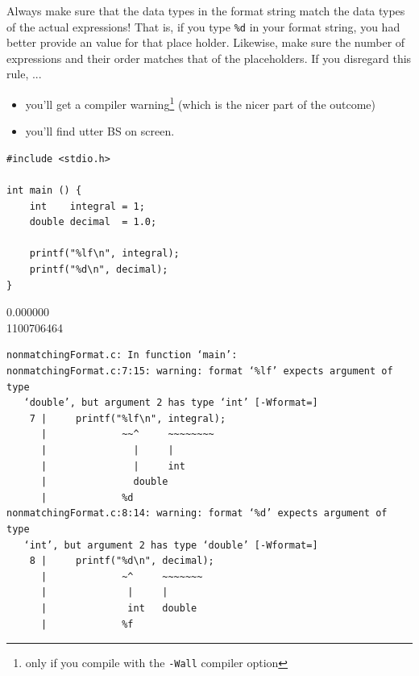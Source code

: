 
\begin{warnbox}
Always make sure that the data types in the format string match the data types of the actual expressions! That is, if you type \texttt{\%d} in your format string, you had better provide an  value for that place holder. Likewise, make sure the number of expressions and their order matches that of the placeholders. If you disregard this rule, ...
\begin{itemize}
\item you'll get a compiler warning\footnote{only if you compile with the \texttt{-Wall} compiler option} (which is the nicer part of the outcome)
\item you'll find utter BS on screen.
\end{itemize}

\begin{tcbraster}[raster columns=2,
                  raster equal height,
                  nobeforeafter,
                  raster column skip=0.2cm]
\begin{warnbox}[nonmatchingFormat.c, leftupper=7mm]
\begin{verbatim}
#include <stdio.h>

int main () {
    int    integral = 1;
    double decimal  = 1.0;
    
    printf("%lf\n", integral);
    printf("%d\n", decimal);
}
\end{verbatim}
\end{warnbox}
%
\begin{cmdbox}
0.000000 \\
1100706464
\end{cmdbox}
\end{tcbraster}
%
\begin{cmdbox}
\begin{verbatim}
nonmatchingFormat.c: In function ‘main’:
nonmatchingFormat.c:7:15: warning: format ‘%lf’ expects argument of type 
   ‘double’, but argument 2 has type ‘int’ [-Wformat=]
    7 |     printf("%lf\n", integral);
      |             ~~^     ~~~~~~~~
      |               |     |
      |               |     int
      |               double
      |             %d
nonmatchingFormat.c:8:14: warning: format ‘%d’ expects argument of type 
   ‘int’, but argument 2 has type ‘double’ [-Wformat=]
    8 |     printf("%d\n", decimal);
      |             ~^     ~~~~~~~
      |              |     |
      |              int   double
      |             %f
\end{verbatim}
\end{cmdbox}


\end{warnbox}
